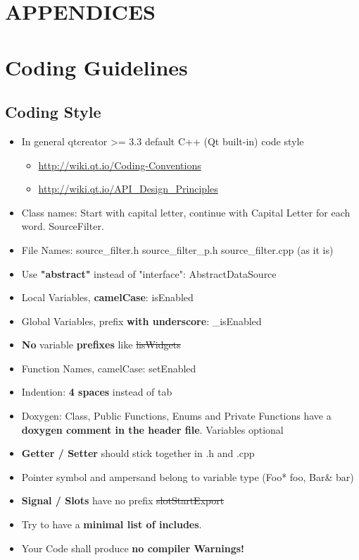 \chapter*{APPENDICES}

\begingroup\let\clearpage\relax
\chapter{Coding Guidelines}
\label{chap:Coding Conventions}
\section{Coding Style}
\begin{itemize}
	\item In general qtcreator >= 3.3 default C++ (Qt built-in) code style
	\begin{itemize}
		\item	\url{http://wiki.qt.io/Coding-Conventions}
		\item	\url{http://wiki.qt.io/API_Design_Principles}
	\end{itemize}
	\item Class names: Start with capital letter, continue with Capital Letter for each word. SourceFilter.
	\item File Names: source\_filter.h source\_filter\_p.h source\_filter.cpp (as it is)
	\item Use \textbf{"abstract"} instead of "interface": AbstractDataSource
	\item Local Variables, \textbf{camelCase}: isEnabled
	\item Global Variables, prefix \textbf{with underscore}: \_isEnabled
	\item \textbf{No} variable \textbf{prefixes} like \sout{lisWidgets}
	\item Function Names, camelCase: setEnabled
	\item Indention: \textbf{4 spaces} instead of tab
	\item Doxygen: Class, Public Functions, Enums and Private Functions have a \textbf{doxygen comment in the header file}. Variables optional
	\item \textbf{Getter / Setter} should stick together in .h and .cpp
	\item Pointer symbol and ampersand belong to variable type (Foo* foo, Bar\& bar)
	\item \textbf{Signal / Slots} have no prefix \sout{slotStartExport}
	\item Try to have a \textbf{minimal list of includes}.
	\item Your Code shall produce \textbf{no compiler Warnings!}
\end{itemize}

